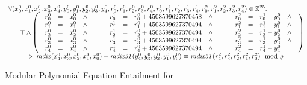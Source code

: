 \begin{figure}
  \centering
  \[
  \begin{array}{l}
  \forall 
    ({x}^0_0, {x}^0_1, {x}^0_2,
     {x}^0_3, {x}^0_4,
     {y}^0_0, {y}^0_1, {y}^0_2,
     {y}^0_3, {y}^0_4,
     {r}^0_0, {r}^0_1, {r}^0_2,
     {r}^0_3, {r}^0_4,
     {r}^1_0, {r}^1_1, {r}^1_2,
     {r}^1_3, {r}^1_4,
     {r}^2_0, {r}^2_1, {r}^2_2,
     {r}^2_3, {r}^2_4) \in \bbfZ^{25}.\\
  \hspace{.05\textwidth}\top \wedge
  \left(
  \begin{array}{lclcl}
    \begin{array}{rclc}
      {r}^0_0 & = & {x}^0_0 & \wedge \\
      {r}^0_1 & = & {x}^0_1 & \wedge \\
      {r}^0_2 & = & {x}^0_2 & \wedge \\
      {r}^0_3 & = & {x}^0_3 & \wedge \\
      {r}^0_4 & = & {x}^0_4 & \wedge \\
    \end{array}
    &\hspace{.01\textwidth}&
    \begin{array}{rclc}
      {r}^1_0 & = & {r}^0_0 + {4503599627370458} & \wedge \\
      {r}^1_1 & = & {r}^0_1 + {4503599627370494} & \wedge \\
      {r}^1_2 & = & {r}^0_2 + {4503599627370494} & \wedge \\
      {r}^1_3 & = & {r}^0_3 + {4503599627370494} & \wedge \\
      {r}^1_4 & = & {r}^0_4 + {4503599627370494} & \wedge\\
    \end{array}
    &\hspace{.01\textwidth}&
    \begin{array}{rclc}
      {r}^2_0 & = & {r}^1_0 - {y}^0_0 & \wedge \\
      {r}^2_1 & = & {r}^1_1 - {y}^0_1 & \wedge \\
      {r}^2_2 & = & {r}^1_2 - {y}^0_2 & \wedge \\
      {r}^2_3 & = & {r}^1_3 - {y}^0_3 & \wedge \\
      {r}^2_4 & = & {r}^1_4 - {y}^0_4
    \end{array}
  \end{array}
  \right)\\
    \hspace{.05\textwidth}
    \implies 
    \mathit{radix}({x}^0_4, {x}^0_3, {x}^0_2, {x}^0_1, {x}^0_0) -
    \mathit{radix51}({y}^0_4, {y}^0_3, {y}^0_2, {y}^0_1, {y}^0_0)
    \equiv
    \mathit{radix51}({r}^2_4, {r}^2_3, {r}^2_2, {r}^2_1, {r}^2_0)
    \mod \myprime
  \end{array}
  \]
  \caption{Modular Polynomial Equation Entailment for }
  \label{figure:translation:subtraction-polynomial}
\end{figure}

